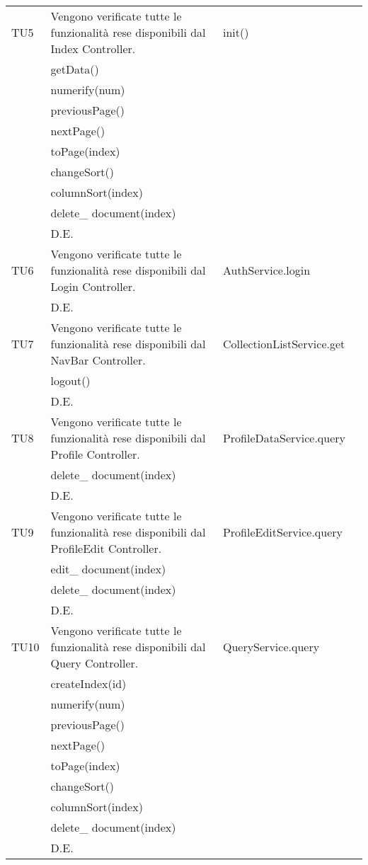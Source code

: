 \begin{center}
\begin{longtable}{|p{2cm}|p{7cm}|p{7cm}|p{2cm}|}
\midrule
TU5
& Vengono verificate tutte le funzionalità rese disponibili dal Index Controller.
& init()\\
& getData()\\
& numerify(num)\\
& previousPage()\\
& nextPage()\\
& toPage(index)\\
& changeSort()\\
& columnSort(index)\\
& delete\_ document(index)\\
& D.E.\\



\midrule
TU6
& Vengono verificate tutte le funzionalità rese disponibili dal Login Controller.
& AuthService.login\\
& D.E.\\


\midrule
TU7
& Vengono verificate tutte le funzionalità rese disponibili dal NavBar Controller.
& CollectionListService.get\\
& logout()\\
& D.E.\\


\midrule
TU8
& Vengono verificate tutte le funzionalità rese disponibili dal Profile Controller.
& ProfileDataService.query\\
& delete\_ document(index)\\
& D.E.\\

\midrule
TU9
& Vengono verificate tutte le funzionalità rese disponibili dal ProfileEdit Controller.
& ProfileEditService.query\\
& edit\_ document(index)\\
& delete\_ document(index)\\
& D.E.\\


\midrule
TU10
& Vengono verificate tutte le funzionalità rese disponibili dal Query Controller.
& QueryService.query\\
& createIndex(id)\\
& numerify(num)\\
& previousPage()\\
& nextPage()\\
& toPage(index)\\
& changeSort()\\
& columnSort(index)\\
& delete\_ document(index)\\
& D.E.\\



\end{longtable}
\end{center}

